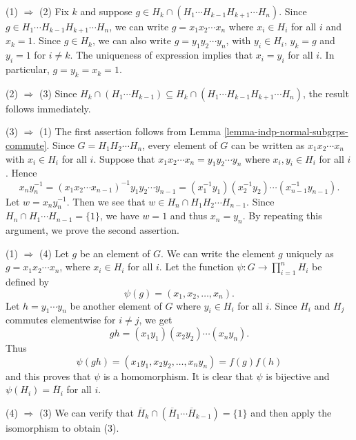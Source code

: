 \begin{sketch}
	(1) $\Rightarrow$ (2)  Fix $k$ and suppose $g \in H_k \cap (H_1\cdots H_{k-1}H_{k+1}\cdots H_n)$. Since $g \in H_1\cdots H_{k-1}H_{k+1}\cdots H_n $, we can write $g = x_1 x_2 \cdots x_n$ where $x_i \in H_i$ for all $i$ and $x_k = 1$. Since $g \in H_k$,  we can also write $g = y_1 y_2 \cdots y_n$, with $y_i \in H_i$, $y_k = g$ and $y_i = 1$ for $i \ne k$. The uniqueness of expression implies that $x_i = y_i$ for all $i$. In particular, $g = y_k = x_k = 1$.
	
	(2) $\Rightarrow$ (3) Since $H_k \cap (H_1\cdots H_{k-1}) \subseteq H_k \cap (H_1\cdots H_{k-1}H_{k+1}\cdots H_n )$, the result follows immediately.
	
	(3) $\Rightarrow$ (1) The first assertion follows from Lemma \ref{lemma-indp-normal-subgrps-commute}. Since $G = H_1 H_2 \cdots H_n$, every element of $G$ can be written as $x_1 x_2 \cdots x_n$ with $x_i \in H_i$ for all $i$. Suppose that $x_1 x_2 \cdots x_n = y_1 y_2 \cdots y_n$ where $x_i,y_i\in H_i$ for all $i$. Hence
	\begin{equation*}
		x_n y_n^{-1} = (x_1 x_2 \cdots x_{n-1})^{-1}y_1 y_2 \cdots y_{n-1} = (x_1^{-1}y_1)(x_2^{-1}y_2)\cdots (x_{n-1}^{-1}y_{n-1}).
	\end{equation*} Let $w = x_n y_n^{-1}$. Then we see that $w\in H_{n}\cap H_1H_2\cdots H_{n-1}$. Since $H_n \cap   H_1 \cdots H_{n-1}= \{1\}$,  we have $w = 1$ and thus $x_n = y_n$. By repeating this argument, we prove the second assertion. 
	
	(1) $\Rightarrow$ (4)  Let $g$ be an element of $G$. We can write the element $g$ uniquely as $g = x_1 x_2 \cdots x_n$, where $x_i \in H_i$ for all $i$. Let the function $\psi: G \rightarrow \prod_{i=1}^n H_i$ be defined by
	\begin{equation*}
		\psi(g) = (x_1, x_2, \dots, x_n).
	\end{equation*}
	Let $h = y_1 \cdots y_n$ be another element of $G$ where $y_i\in H_i$ for all $i$. Since $H_i$ and $H_j$ commutes elementwise for $i\neq j$, we get
	\begin{equation*}
		gh = (x_1 y_1)(x_2 y_2) \cdots (x_n y_n).
	\end{equation*}
	Thus
	\begin{equation*}
		\psi(gh) = (x_1 y_1, x_2 y_2, \ldots, x_n y_n) = f(g)f(h)
	\end{equation*}
	and this proves that $\psi$ is a homomorphism. It is clear that $\psi$ is bijective and $\psi(H_i) = \overline{H}_i$ for all $i$.
	
	(4) $\Rightarrow$ (3) We can verify that $\overline{H}_k \cap (\overline{H}_1 \cdots \overline{H}_{k-1}) = \{1\}$ and then apply the isomorphism to obtain (3).
\end{sketch}

